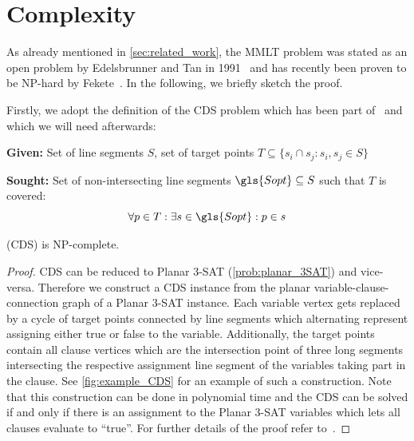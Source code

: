 \section{Complexity}
\label{sec:mmlt_complexity}
As already mentioned in \cref{sec:related_work}, the \gls{MMLT}
problem was stated as an open problem by Edelsbrunner and Tan in
1991~\cite{triangulation_minmax_length} and has recently been proven
to be NP-hard by Fekete~\cite{mmlt_complexity}. In the following, we
briefly sketch the proof.

Firstly, we adopt the definition of the \gls{CDS} problem which has
been part of~\cite{mmlt_complexity} and which we will need
afterwards:

\begin{problem}
  \label{prob:cds}\hfill
  \begin{labeling}{\hspace{4em}}
    \item[\textbf{Given:}]
      Set of line segments \(S\), 
      set of target points
      \(T \subseteq \{ s_i \cap s_j : s_i,s_j \in S \} \)
    \item[\textbf{Sought:}]
      Set of non-intersecting line segments
      \(\gls{Sopt} \subseteq S\) such that \(T\) is covered:
      \[ \forall p \in T: \exists s \in \gls{Sopt} : p \in s \]
  \end{labeling}
\end{problem}

\begin{theorem}
  \label{thm:complexity_cds}
   (\gls{CDS}) is NP-complete.
  \begin{proof}
  \gls{CDS} can be reduced to Planar 3-SAT (\cref{prob:planar_3SAT})
  and vice-versa. Therefore we construct a \gls{CDS} instance from
  the planar variable-clause-connection graph of a Planar 3-SAT
  instance. Each variable vertex gets replaced by a cycle of target
  points connected by line segments which alternating
  represent assigning either true or false to the variable.
  Additionally, the target points contain all clause vertices which
  are the intersection point of three long segments intersecting
  the respective assignment line segment of the variables taking
  part in the clause. See \cref{fig:example_CDS} for an example of
  such a construction. Note that this construction can be done in
  polynomial time and the \gls{CDS} can be solved if and
  only if there is an assignment to the Planar 3-SAT variables which
  lets all clauses evaluate to ``true''.
  For further details of the proof refer to~\cite{mmlt_complexity}.
  \end{proof}
\end{theorem}

